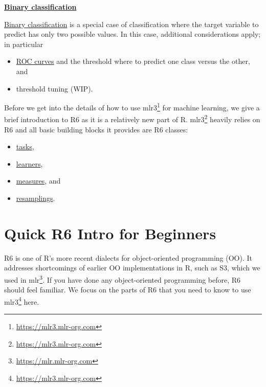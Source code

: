 \documentclass[12pt,]{scrbook}
\providecommand{\tightlist}{%
  \setlength{\itemsep}{0pt}\setlength{\parskip}{0pt}}
\renewcommand{\href}[2]{#2\footnote{\url{#1}}}
\begin{document}
\protect\hyperlink{binary}{\textbf{Binary classification}}

\protect\hyperlink{binary}{Binary classification} is a special case of classification where the target variable to predict has only two possible values.
In this case, additional considerations apply; in particular

\begin{itemize}
\tightlist
\item
  \protect\hyperlink{binary-roc}{ROC curves} and the threshold where to predict one class versus the other, and
\item
  threshold tuning (WIP).
\end{itemize}

Before we get into the details of how to use \href{https://mlr3.mlr-org.com}{mlr3} for machine learning, we give a brief introduction to R6 as it is a relatively new part of R.
\href{https://mlr3.mlr-org.com}{mlr3} heavily relies on R6 and all basic building blocks it provides are R6 classes:

\begin{itemize}
\tightlist
\item
  \protect\hyperlink{tasks}{tasks},
\item
  \protect\hyperlink{learners}{learners},
\item
  \protect\hyperlink{measures}{measures}, and
\item
  \protect\hyperlink{resampling}{resamplings}.
\end{itemize}

\hypertarget{r6}{%
\section{Quick R6 Intro for Beginners}\label{r6}}

R6 is one of R's more recent dialects for object-oriented programming (OO).
It addresses shortcomings of earlier OO implementations in R, such as S3, which we used in \href{https://mlr.mlr-org.com}{mlr}.
If you have done any object-oriented programming before, R6 should feel familiar.
We focus on the parts of R6 that you need to know to use \href{https://mlr3.mlr-org.com}{mlr3} here.
\end{document}
